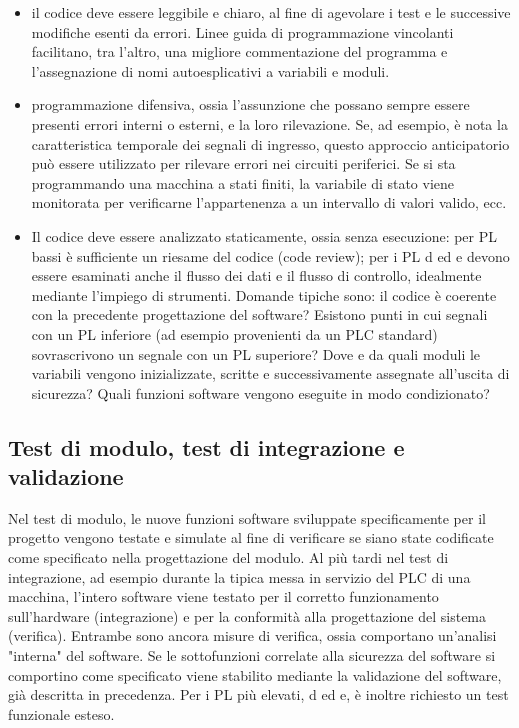 \begin{itemize}
    \item il codice deve essere leggibile e chiaro, al fine di agevolare i test e le successive modifiche esenti da errori. Linee guida di programmazione vincolanti facilitano, tra l'altro, una migliore commentazione del programma e l'assegnazione di nomi autoesplicativi a variabili e moduli.
    \item programmazione difensiva, ossia l'assunzione che possano sempre essere presenti errori interni o esterni, e la loro rilevazione. Se, ad esempio, è nota la caratteristica temporale dei segnali di ingresso, questo approccio anticipatorio può essere utilizzato per rilevare errori nei circuiti periferici. Se si sta programmando una macchina a stati finiti, la variabile di stato viene monitorata per verificarne l'appartenenza a un intervallo di valori valido, ecc.
    \item Il codice deve essere analizzato staticamente, ossia senza esecuzione: per PL bassi è sufficiente un riesame del codice (code review); per i PL d ed e devono essere esaminati anche il flusso dei dati e il flusso di controllo, idealmente mediante l'impiego di strumenti. Domande tipiche sono: il codice è coerente con la precedente progettazione del software? Esistono punti in cui segnali con un PL inferiore (ad esempio provenienti da un PLC standard) sovrascrivono un segnale con un PL superiore? Dove e da quali moduli le variabili vengono inizializzate, scritte e successivamente assegnate all'uscita di sicurezza? Quali funzioni software vengono eseguite in modo condizionato?
\end{itemize}

\subsection{Test di modulo, test di integrazione e validazione}
\label{subsec:06-3-5}
Nel test di modulo, le nuove funzioni software sviluppate specificamente per il progetto vengono testate e simulate al fine di verificare se siano state codificate come specificato nella progettazione del modulo. Al più tardi nel test di integrazione, ad esempio durante la tipica messa in servizio del PLC di una macchina, l'intero software viene testato per il corretto funzionamento sull'hardware (integrazione) e per la conformità alla progettazione del sistema (verifica). Entrambe sono ancora misure di verifica, ossia comportano un'analisi "interna" del software. Se le sottofunzioni correlate alla sicurezza del software si comportino come specificato viene stabilito mediante la validazione del software, già descritta in precedenza. Per i PL più elevati, d ed e, è inoltre richiesto un test funzionale esteso.

